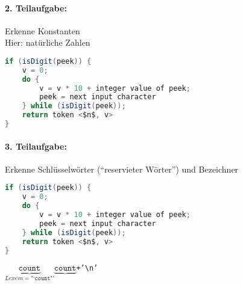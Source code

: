\paragraph{2. Teilaufgabe:} Erkenne Konstanten\\
Hier: natürliche Zahlen
\begin{lstlisting}[language=Java,mathescape=True]
if (isDigit(peek)) {
    v = 0;
    do {
        v = v * 10 + integer value of peek;
        peek = next input character
    } while (isDigit(peek));
    return token <$n$, v>
}
\end{lstlisting}

\paragraph{3. Teilaufgabe:} Erkenne Schlüsselwörter ("`reservieter Wörter"') und Bezeichner
\begin{lstlisting}[language=Java,mathescape=True]
if (isDigit(peek)) {
    v = 0;
    do {
        v = v * 10 + integer value of peek;
        peek = next input character
    } while (isDigit(peek));
    return token <$n$, v>
}
\end{lstlisting}

\begin{center}
\texttt{\dq\textvisiblespace\textvisiblespace\textvisiblespace  $\underbrace{\texttt{count}}_{Lexem = \texttt{"`count"'}}$\textvisiblespace\textvisiblespace $\underbrace{\texttt{count}}$\textvisiblespace +'\textbackslash n'\dq}
\end{center}

